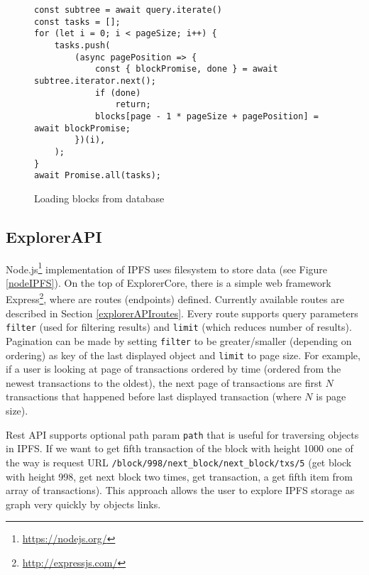 \begin{figure}[h]
    \centering
    \begin{lstlisting}[style=ES6]
const subtree = await query.iterate()
const tasks = [];
for (let i = 0; i < pageSize; i++) {
    tasks.push(
        (async pagePosition => {
            const { blockPromise, done } = await subtree.iterator.next();
            if (done)
                return;
            blocks[page - 1 * pageSize + pagePosition] = await blockPromise;
        })(i),
    );
}
await Promise.all(tasks);
    \end{lstlisting}
    \caption{Loading blocks from database}
    \label{blocksLoading}
\end{figure}



\subsection{ExplorerAPI}
Node.js\footnote{\url{https://nodejs.org/}} implementation of IPFS uses filesystem to store data (see Figure \ref{nodeIPFS}). On the top of ExplorerCore, there is a simple web framework Express\footnote{\url{http://expressjs.com/}}, where are routes (endpoints) defined. Currently available routes are described in Section \ref{explorerAPIroutes}. Every route supports query parameters \texttt{filter} (used for filtering results) and \texttt{limit} (which reduces number of results). Pagination can be made by setting \texttt{filter} to be greater/smaller (depending on ordering) as key of the last displayed object and \texttt{limit} to page size. For example, if a user is looking at page of transactions ordered by time (ordered from the newest transactions to the oldest), the next page of transactions are first \(N\) transactions that happened before last displayed transaction (where \(N\) is page size).

Rest API supports optional path param \texttt{path} that is useful for traversing objects in IPFS. If we want to get fifth transaction of the block with height 1000 one of the way is request URL \texttt{/block/998/next\_block/next\_block/txs/5} (get block with height 998, get next block two times, get transaction, a get fifth item from array of transactions). This approach allows the user to explore IPFS storage as graph very quickly by objects links.

